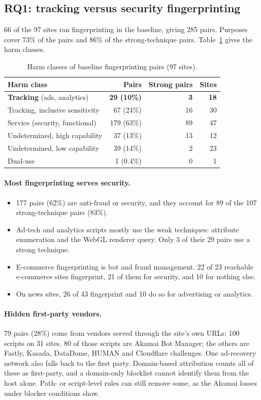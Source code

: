 \documentclass[sigconf,review,anonymous]{acmart}
\begin{document}
\subsection{RQ1: tracking versus security fingerprinting}
66 of the 97 sites ran fingerprinting in the baseline, giving 285 pairs. Purposes cover 73\% of
the pairs and 86\% of the strong-technique pairs. Table~\ref{tab:harm} gives the harm classes.

\begin{table}[t]
\caption{Harm classes of baseline fingerprinting pairs (97 sites).}\label{tab:harm}
\small
\begin{tabular}{@{}lrrr@{}}
\toprule
Harm class & Pairs & Strong pairs & Sites \\
\midrule
\textbf{Tracking} (ads, analytics) & \textbf{29 (10\%)} & \textbf{3} & \textbf{18} \\
Tracking, inclusive sensitivity & 67 (24\%)  & 16 & 30 \\
Service (security, functional) & 179 (63\%) & 89 & 47 \\
Undetermined, high capability  & 37 (13\%)  & 13 & 12 \\
Undetermined, low capability   & 39 (14\%)  & 2  & 23 \\
Dual-use                       & 1 (0.4\%)  & 0  & 1 \\
\bottomrule
\end{tabular}
\end{table}

\paragraph{Most fingerprinting serves security.}
\begin{itemize}
\item 177 pairs (62\%) are anti-fraud or security, and they account for 89 of the 107
  strong-technique pairs (83\%).
\item Ad-tech and analytics scripts mostly use the weak techniques: attribute enumeration and
  the WebGL renderer query. Only 3 of their 29 pairs use a strong technique.
\item E-commerce fingerprinting is bot and fraud management. 22 of 23 reachable e-commerce sites
  fingerprint, 21 of them for security, and 10 for nothing else.
\item On news sites, 26 of 43 fingerprint and 10 do so for advertising or analytics.
\end{itemize}

\paragraph{Hidden first-party vendors.} 79 pairs (28\%) come from vendors served through the
site's own URLs: 100 scripts on 31 sites. 80 of those scripts are Akamai Bot Manager; the others
are Fastly, Kasada, DataDome, HUMAN and Cloudflare challenges. One ad-recovery network also falls
back to the first party. Domain-based attribution counts all of these as first-party, and a
domain-only blocklist cannot identify them from the host alone. Path- or script-level rules can
still remove some, as the Akamai losses under blocker conditions show.
\end{document}
